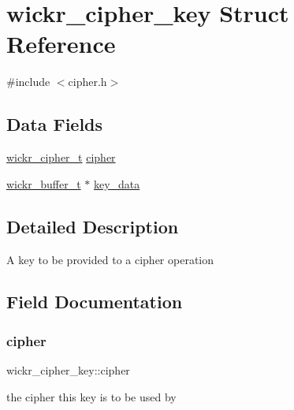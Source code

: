 \hypertarget{structwickr__cipher__key}{}\section{wickr\+\_\+cipher\+\_\+key Struct Reference}
\label{structwickr__cipher__key}


{\ttfamily \#include $<$cipher.\+h$>$}

\subsection*{Data Fields}
\begin{DoxyCompactItemize}
\item 
\mbox{\hyperlink{structwickr__cipher}{wickr\+\_\+cipher\+\_\+t}} \mbox{\hyperlink{structwickr__cipher__key_a6506e1a07f7bc2c5ceeb0ca5ce81385b}{cipher}}
\item 
\mbox{\hyperlink{structwickr__buffer}{wickr\+\_\+buffer\+\_\+t}} $\ast$ \mbox{\hyperlink{structwickr__cipher__key_a0bf9fa22f1db80010410ae609aac8a2a}{key\+\_\+data}}
\end{DoxyCompactItemize}


\subsection{Detailed Description}
A key to be provided to a cipher operation 

\subsection{Field Documentation}
\mbox{\label{structwickr__cipher__key_a6506e1a07f7bc2c5ceeb0ca5ce81385b}} 
\subsubsection{\texorpdfstring{cipher}{cipher}}
{\footnotesize\ttfamily wickr\+\_\+cipher\+\_\+key\+::cipher}

the cipher this key is to be used by \mbox{\label{structwickr__cipher__key_a0bf9fa22f1db80010410ae609aac8a2a}} 

